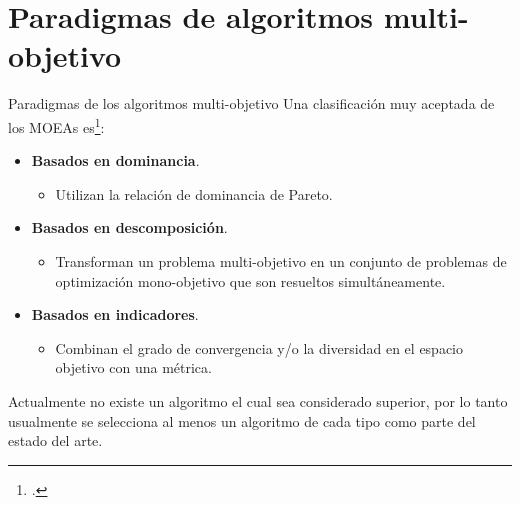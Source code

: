 \documentclass{beamer}
\begin{document}
\section{Paradigmas de algoritmos multi-objetivo}

\begin{frame}{Paradigmas de los algoritmos multi-objetivo}
Una clasificación muy aceptada de los MOEAs es\footcite{trivedi2016survey}:
\begin{itemize}
\justifying
\item \textbf{Basados en dominancia}.
   \begin{itemize}
       \item Utilizan la relación de dominancia de Pareto.
   \end{itemize}
\justifying
\item \textbf{Basados en descomposición}.
\begin{itemize}
       \item Transforman un problema multi-objetivo en un conjunto de problemas de optimización mono-objetivo que son resueltos simultáneamente.
   \end{itemize}
\justifying
\item \textbf{Basados en indicadores}.
    \begin{itemize}
        \item Combinan el grado de convergencia y/o la diversidad en el espacio objetivo con una métrica.
    \end{itemize}
\end{itemize}

\justifying
\scriptsize
Actualmente no existe un algoritmo el cual sea considerado superior, por lo tanto usualmente se selecciona al menos un algoritmo de cada tipo como parte del estado del arte.
\end{frame}
\end{document}
